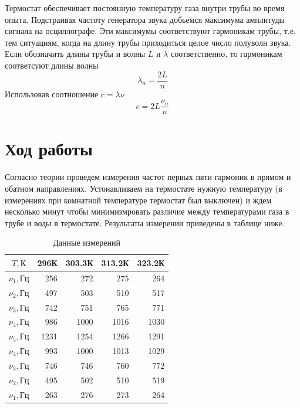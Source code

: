 \documentclass[a4paper, 12pt]{article}
\begin{document}
    Термостат обеспечивает постоянную температуру газа внутри трубы во время опыта.
    Подстраивая частоту генератора звука добьемся максимума амплитуды сигнала на
    осциллографе. Эти максимумы соответствуют гармоникам трубы, т.е. тем ситуациям,
    когда на длину трубы приходиться целое число полуволн звука. Если обозначить длины
    трубы и волны $L$ и $\lambda$ соответственно, то гармоникам соответсуют длины волны
    \[\lambda_n=\frac{2L}{n}\]
    Использовав соотношение $c=\lambda\nu$
    \begin{equation}
        c=2L\frac{\nu_n}{n}
    \end{equation}

    \section{Ход работы}
    Согласно теории проведем измерения частот первых пяти гармоник в прямом и обатном
    направлениях. Устонавливаем на термостате нужную температуру (в измерениях при
    комнатной температуре термостат был выключен) и ждем несколько минут чтобы
    минимизмровать различие между температурами газа в трубе и воды в термостате.
    Результаты измерении приведены в таблице ниже.

    \begin{table}[h]
        \begin{center}
            \begin{tabular}{|c|r|r|r|r|}
                \hline
                {$T, К$} &   296К &  303.3К &  313.2К &  323.2К \\
                \hline
                $\nu_1, Гц$ &   256 &    272 &    275 &    264 \\\hline
                $\nu_2, Гц$ &   497 &    503 &    510 &    517 \\\hline
                $\nu_3, Гц$ &   742 &    751 &    765 &    771 \\\hline
                $\nu_4, Гц$ &   986 &   1000 &   1016 &   1030 \\\hline
                $\nu_5, Гц$ &  1231 &   1254 &   1266 &   1291 \\\hline
                $\nu_4, Гц$ &   993 &   1000 &   1013 &   1029 \\\hline
                $\nu_3, Гц$ &   746 &    746 &    760 &    772 \\\hline
                $\nu_2, Гц$ &   495 &    502 &    510 &    519 \\\hline
                $\nu_1, Гц$ &   263 &    276 &    273 &    264 \\\hline
            \end{tabular}
        \end{center}
        \caption{Данные измерений}
    \end{table}
\end{document}
